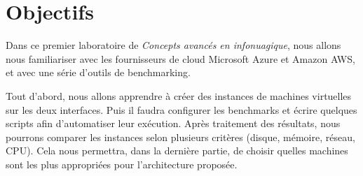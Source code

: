 \section*{Objectifs}

Dans ce premier laboratoire de \textit{Concepts avancés en infonuagique}, nous allons nous familiariser avec les fournisseurs de cloud Microsoft Azure et Amazon AWS, et avec une série d'outils de benchmarking. \newline

Tout d'abord, nous allons apprendre à créer des instances de machines virtuelles sur les deux interfaces. Puis il faudra configurer les benchmarks et écrire quelques scripts afin d'automatiser leur exécution. Après traitement des résultats, nous pourrons comparer les instances selon plusieurs critères (disque, mémoire, réseau, CPU). Cela nous permettra, dans la dernière partie, de choisir quelles machines sont les plus appropriées pour l'architecture proposée.